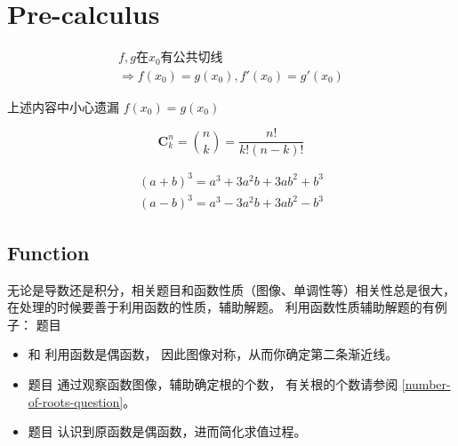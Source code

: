 \chapter{Pre-calculus}

\begin{lemma}
\begin{multline*}
	f, g \mbox{在} x_0 \mbox{有公共切线} \\ \Rightarrow f(x_0) = g(x_0), f'(x_0) = g'(x_0)
\end{multline*}
\end{lemma}
上述内容中小心遗漏 $f(x_0) = g(x_0)$

\begin{definition}
    \begin{equation}
        \mathbf{C}_{k}^{n} = \binom{n}{k} = \frac{n!}{k!(n-k)!}
    \end{equation}
\end{definition}

\begin{lemma}
    \begin{align*}
        (a+b)^3 = a^3 + 3a^2b + 3ab^2 + b^3\\
        (a-b)^3 = a^3 - 3a^2b + 3ab^2 - b^3
    \end{align*}
\end{lemma}

\section{Function}

无论是导数还是积分，相关题目和函数性质（图像、单调性等）相关性总是很大，
在处理的时候要善于利用函数的性质，辅助解题。
利用函数性质辅助解题的有例子：
题目 
\begin{itemize}

    \item   \cite[page 70, pdf 81, 例1]{we} 和 
            \cite[page 75, pdf 86, 例6]{we}利用函数是偶函数，
            因此图像对称，从而你确定第二条渐近线。

    \item   题目 \cite[page 77, pdf 88, 例5, 例6]{we} 
            通过观察函数图像，辅助确定根的个数，
            有关根的个数请参阅 \ref{number-of-roots-question}。

    \item   题目 \cite[page 107, pdf 118, example 4]{we}
            认识到原函数是偶函数，进而简化求值过程。

\end{itemize}

